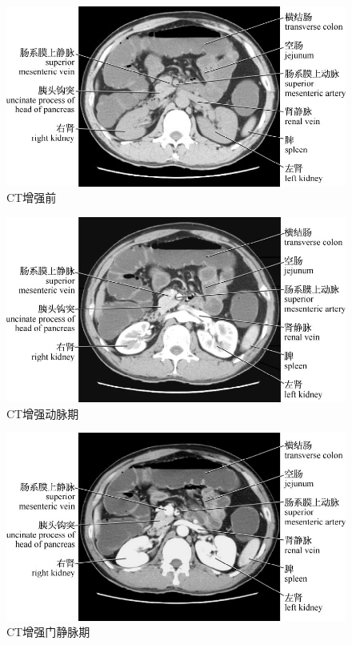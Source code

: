 \begin{figure}[!htbp]
 \centering
 \includegraphics{./images/Image00152.jpg}
 \captionsetup{justification=centering}
 \caption{CT增强前}
  \end{figure} 
 \FloatBarrier

\begin{figure}[!htbp]
 \centering
 \includegraphics{./images/Image00153.jpg}
 \captionsetup{justification=centering}
 \caption{CT增强动脉期}
  \end{figure} 
 \FloatBarrier

\begin{figure}[!htbp]
 \centering
 \includegraphics{./images/Image00154.jpg}
 \captionsetup{justification=centering}
 \caption{CT增强门静脉期}
  \end{figure} 
 \FloatBarrier

